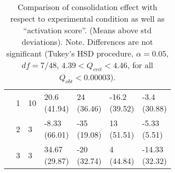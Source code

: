 \begin{table*}
\begin{tabularx}{\textwidth}{XXXXXXX}
      & 1
      & 10
      & \cellcontent{20.6\\(41.94)}
      & \cellcontent{24\\(36.46)}
      & \cellcontent{-16.2\\(39.52)}
      & \cellcontent{-3.4\\(30.88)}
      \\

      & 2
      & 3
      & \cellcontent{-8.33\\(66.01)}
      & \cellcontent{-35\\(19.08)}
      & \cellcontent{13\\(51.51)}
      & \cellcontent{-5.33\\(5.51)}
      \\

      & 3
      & 3
      & \cellcontent{34.67\\(29.87)}
      & \cellcontent{-20\\(32.74)}
      & \cellcontent{4\\(44.84)}
      & \cellcontent{-14.33\\(32.32)}
      \\

      \bottomrule
    \end{tabularx}
    \endgroup
  \caption{Comparison of consolidation effect with respect to
    experimental condition as well as ``activation score''. (Means
    above std deviations). Note. Differences are not significant
    (Tukey's HSD procedure, $\alpha=0.05$, $df = 7/48$,  $4.39 <
    Q_{crit} < 4.46$, for all $Q_{obt}<0.00003$).\label{tab:activation}}
\end{table*}



